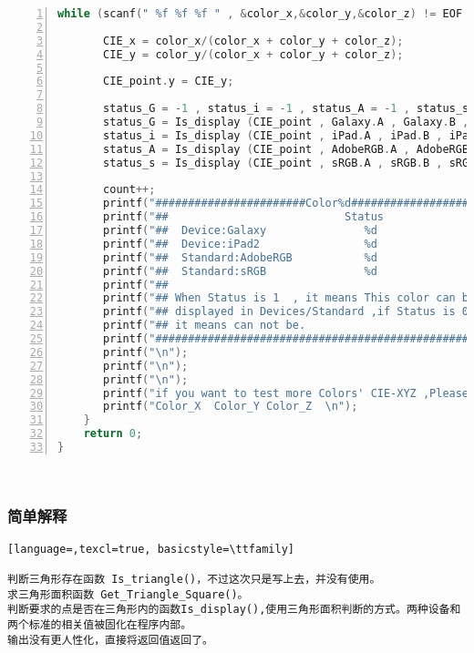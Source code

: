 \documentclass[UTF8]{article}
\begin{document}
\begin{lstlisting}[language=C, label=lst:Sources, caption=Sources, numbers=left, stepnumber=1, frame=leftline , texcl=true, basicstyle=\ttfamily]
    while (scanf(" %f %f %f " , &color_x,&color_y,&color_z) != EOF ){

       CIE_x = color_x/(color_x + color_y + color_z);
       CIE_y = color_y/(color_x + color_y + color_z);

       CIE_point.y = CIE_y;

       status_G = -1 , status_i = -1 , status_A = -1 , status_s = -1 ;
       status_G = Is_display (CIE_point , Galaxy.A , Galaxy.B , Galaxy.C );
       status_i = Is_display (CIE_point , iPad.A , iPad.B , iPad.C );
       status_A = Is_display (CIE_point , AdobeRGB.A , AdobeRGB.B , AdobeRGB.C );
       status_s = Is_display (CIE_point , sRGB.A , sRGB.B , sRGB.C );

       count++;
       printf("#######################Color%d########################\n",count );
       printf("##                           Status                ##\n");
       printf("##  Device:Galaxy               %d                  ##\n",status_G );
       printf("##  Device:iPad2                %d                  ##\n",status_i );
       printf("##  Standard:AdobeRGB           %d                  ##\n",status_A );
       printf("##  Standard:sRGB               %d                  ##\n",status_s );
       printf("##                                                 ##\n");
       printf("## When Status is 1  , it means This color can be  ##\n");
       printf("## displayed in Devices/Standard ,if Status is 0 , ##\n");
       printf("## it means can not be.                            ##\n");
       printf("#####################################################\n");
       printf("\n");
       printf("\n");
       printf("\n");
       printf("if you want to test more Colors' CIE-XYZ ,Please input \n");
       printf("Color_X  Color_Y Color_Z  \n");
    }
    return 0;
}
\end{lstlisting}            
~
\subsubsection{简单解释}

\begin{lstlisting}[language=,texcl=true, basicstyle=\ttfamily]

判断三角形存在函数 Is_triangle()，不过这次只是写上去，并没有使用。
求三角形面积函数 Get_Triangle_Square()。
判断要求的点是否在三角形内的函数Is_display(),使用三角形面积判断的方式。两种设备和两个标准的相关值被固化在程序内部。
输出没有更人性化，直接将返回值返回了。

\end{lstlisting}
\end{document}
